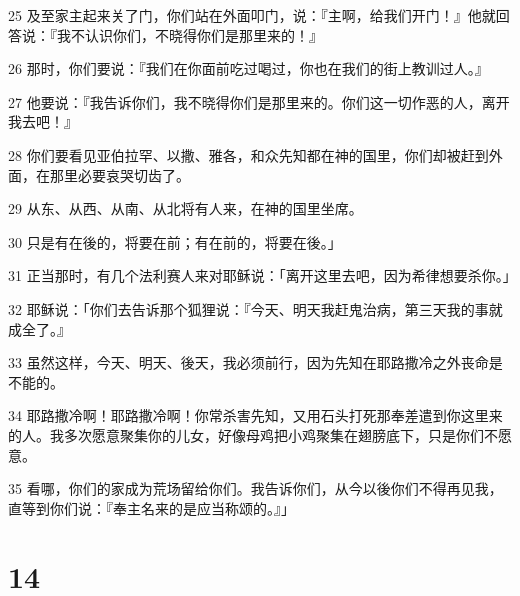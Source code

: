 \par 25 及至家主起来关了门，你们站在外面叩门，说：『主啊，给我们开门！』他就回答说：『我不认识你们，不晓得你们是那里来的！』
\par 26 那时，你们要说：『我们在你面前吃过喝过，你也在我们的街上教训过人。』
\par 27 他要说：『我告诉你们，我不晓得你们是那里来的。你们这一切作恶的人，离开我去吧！』
\par 28 你们要看见亚伯拉罕、以撒、雅各，和众先知都在神的国里，你们却被赶到外面，在那里必要哀哭切齿了。
\par 29 从东、从西、从南、从北将有人来，在神的国里坐席。
\par 30 只是有在後的，将要在前；有在前的，将要在後。」
\par 31 正当那时，有几个法利赛人来对耶稣说：「离开这里去吧，因为希律想要杀你。」
\par 32 耶稣说：「你们去告诉那个狐狸说：『今天、明天我赶鬼治病，第三天我的事就成全了。』
\par 33 虽然这样，今天、明天、後天，我必须前行，因为先知在耶路撒冷之外丧命是不能的。
\par 34 耶路撒冷啊！耶路撒冷啊！你常杀害先知，又用石头打死那奉差遣到你这里来的人。我多次愿意聚集你的儿女，好像母鸡把小鸡聚集在翅膀底下，只是你们不愿意。
\par 35 看哪，你们的家成为荒场留给你们。我告诉你们，从今以後你们不得再见我，直等到你们说：『奉主名来的是应当称颂的。』」

\chapter{14}

